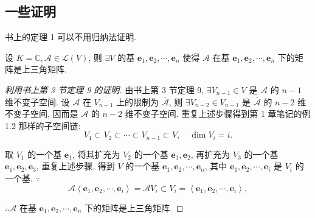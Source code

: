 \documentclass[color=black,device=normal,lang=cn,mode=geye]{elegantnote}
\begin{document}
\subsection{一些证明}
书上的定理 1 可以不用归纳法证明.
\begin{theorem}
    设 $K=\mathbb{C},\mathcal{A}\in\mathcal{L}(V)$, 则 $\exists V$ 的基 $\boldsymbol{e}_1,\boldsymbol{e}_2,\cdots,\boldsymbol{e}_n$ 使得 $\mathcal{A}$ 在基 $\boldsymbol{e}_1,\boldsymbol{e}_2,\cdots,\boldsymbol{e}_n$ 下的矩阵是上三角矩阵.
\end{theorem}
\begin{proof}[利用书上第 3 节定理 9 的证明]
    由书上第 3 节定理 9, $\exists V_{n-1}\in V$ 是 $\mathcal{A}$ 的 $n-1$ 维不变子空间. 设 $\mathcal{A}$ 在 $V_{n-1}$ 上的限制为 $\overline{\mathcal{A}}$, 则 $\exists V_{n-2}\in V_{n-1}$ 是 $\overline{\mathcal{A}}$ 的 $n-2$ 维不变子空间, 因而是 $\mathcal{A}$ 的 $n-2$ 维不变子空间. 重复上述步骤得到第 1 章笔记的例 1.2 那样的子空间链:
    \[V_1\subset V_2\subset\cdots\subset V_{n-1}\subset V,\quad\dim V_i=i.\]

    取 $V_1$ 的一个基 $\boldsymbol{e}_1$, 将其扩充为 $V_2$ 的一个基 $\boldsymbol{e}_1,\boldsymbol{e}_2$, 再扩充为 $V_3$ 的一个基 $\boldsymbol{e}_1,\boldsymbol{e}_2,\boldsymbol{e}_3$, 重复上述步骤, 得到 $V$ 的一个基 $\boldsymbol{e}_1,\boldsymbol{e}_2,\cdots,\boldsymbol{e}_n$, 其中 $\boldsymbol{e}_1,\boldsymbol{e}_2,\cdots,\boldsymbol{e}_i$ 是 $V_i$ 的一个基. $\because$
    \[\mathcal{A}\left<\boldsymbol{e}_1,\boldsymbol{e}_2,\cdots,\boldsymbol{e}_i\right>=\mathcal{A}V_i\subset V_i=\left<\boldsymbol{e}_1,\boldsymbol{e}_2,\cdots,\boldsymbol{e}_i\right>,\]

    $\therefore\mathcal{A}$ 在基 $\boldsymbol{e}_1,\boldsymbol{e}_2,\cdots,\boldsymbol{e}_n$ 下的矩阵是上三角矩阵.
\end{proof}
\end{document}
